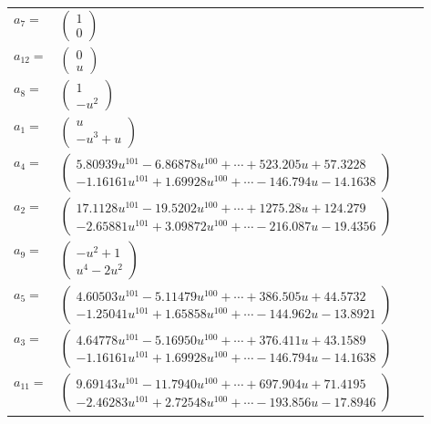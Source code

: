 \documentclass[1p]{elsarticle_modified}
\theoremstyle{definition}
\begin{document}
\begin{tabular}{m{7pt} m{180pt} m{7pt} m{180pt} }
\flushright $a_{7}=$&$\begin{pmatrix}1\\0\end{pmatrix}$ \\
\flushright $a_{12}=$&$\begin{pmatrix}0\\u\end{pmatrix}$ \\
\flushright $a_{8}=$&$\begin{pmatrix}1\\- u^2\end{pmatrix}$ \\
\flushright $a_{1}=$&$\begin{pmatrix}u\\- u^3+u\end{pmatrix}$ \\
\flushright $a_{4}=$&$\begin{pmatrix}5.80939 u^{101}-6.86878 u^{100}+\cdots+523.205 u+57.3228\\-1.16161 u^{101}+1.69928 u^{100}+\cdots-146.794 u-14.1638\end{pmatrix}$ \\
\flushright $a_{2}=$&$\begin{pmatrix}17.1128 u^{101}-19.5202 u^{100}+\cdots+1275.28 u+124.279\\-2.65881 u^{101}+3.09872 u^{100}+\cdots-216.087 u-19.4356\end{pmatrix}$ \\
\flushright $a_{9}=$&$\begin{pmatrix}- u^2+1\\u^4-2 u^2\end{pmatrix}$ \\
\flushright $a_{5}=$&$\begin{pmatrix}4.60503 u^{101}-5.11479 u^{100}+\cdots+386.505 u+44.5732\\-1.25041 u^{101}+1.65858 u^{100}+\cdots-144.962 u-13.8921\end{pmatrix}$ \\
\flushright $a_{3}=$&$\begin{pmatrix}4.64778 u^{101}-5.16950 u^{100}+\cdots+376.411 u+43.1589\\-1.16161 u^{101}+1.69928 u^{100}+\cdots-146.794 u-14.1638\end{pmatrix}$ \\
\flushright $a_{11}=$&$\begin{pmatrix}9.69143 u^{101}-11.7940 u^{100}+\cdots+697.904 u+71.4195\\-2.46283 u^{101}+2.72548 u^{100}+\cdots-193.856 u-17.8946\end{pmatrix}$ \\

\end{tabular}
\end{document}
